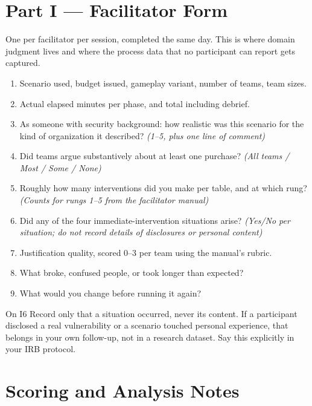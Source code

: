 \documentclass[11pt,letterpaper]{article}
\begin{document}
\section{Part I --- Facilitator Form}

One per facilitator per session, completed the same day. This is where domain
judgment lives and where the process data that no participant can report gets
captured.

\begin{enumerate}[label=I\arabic*.]
\item Scenario used, budget issued, gameplay variant, number of teams, team sizes.
\item Actual elapsed minutes per phase, and total including debrief.
\item As someone with security background: how realistic was this scenario for
the kind of organization it described? \emph{(1--5, plus one line of comment)}
\item Did teams argue substantively about at least one purchase?
\emph{(All teams / Most / Some / None)}
\item Roughly how many interventions did you make per table, and at which rung?
\emph{(Counts for rungs 1--5 from the facilitator manual)}
\item Did any of the four immediate-intervention situations arise? \emph{(Yes/No
per situation; do not record details of disclosures or personal content)}
\item Justification quality, scored 0--3 per team using the manual's rubric.
\item What broke, confused people, or took longer than expected?
\item What would you change before running it again?
\end{enumerate}

\begin{caution}{On I6}
Record only that a situation occurred, never its content. If a participant
disclosed a real vulnerability or a scenario touched personal experience, that
belongs in your own follow-up, not in a research dataset. Say this explicitly in
your IRB protocol.
\end{caution}

\section{Scoring and Analysis Notes}
\end{document}
